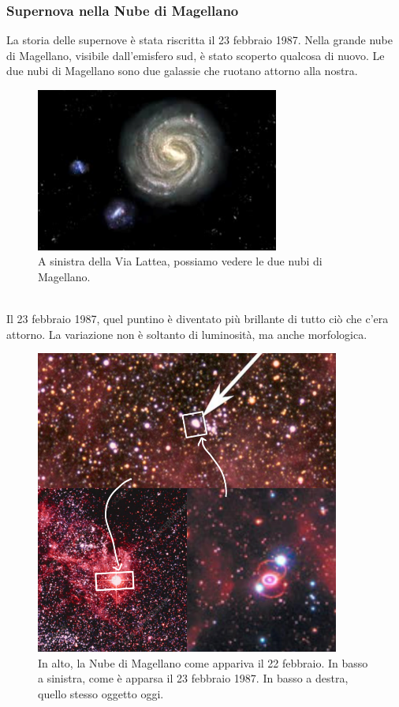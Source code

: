 \documentclass[a4paper,11pt]{article}
\begin{document}
\subsubsection{Supernova nella Nube di Magellano}
La storia delle supernove è stata riscritta il 23 febbraio 1987. Nella  grande nube di Magellano, visibile dall'emisfero sud, è stato scoperto qualcosa di nuovo. Le due nubi di Magellano sono due galassie che ruotano attorno alla nostra.
\begin{figure}[h!!]
        \centering
        \includegraphics[width=8cm]{lezione 28 novembre/nubidimagellano.png}
        \caption{A sinistra della Via Lattea, possiamo vedere le due nubi di Magellano.}
        \label{lezione 28 novembre/nubidimagellano.png}
    \end{figure}
    \\
Il 23 febbraio 1987, quel puntino è diventato più brillante di tutto ciò che c'era attorno. La variazione non è soltanto di luminosità, ma anche morfologica.
\begin{figure}[h!!]
        \centering
        \includegraphics[width=10cm]{lezione 28 novembre/sn1897a.png}
        \caption{In alto, la Nube di Magellano come appariva il 22 febbraio. In basso a sinistra, come è apparsa il 23 febbraio 1987. In basso a destra, quello stesso oggetto oggi.}
        \label{lezione 28 novembre/sn1897a.png}
    \end{figure}
\end{document}
